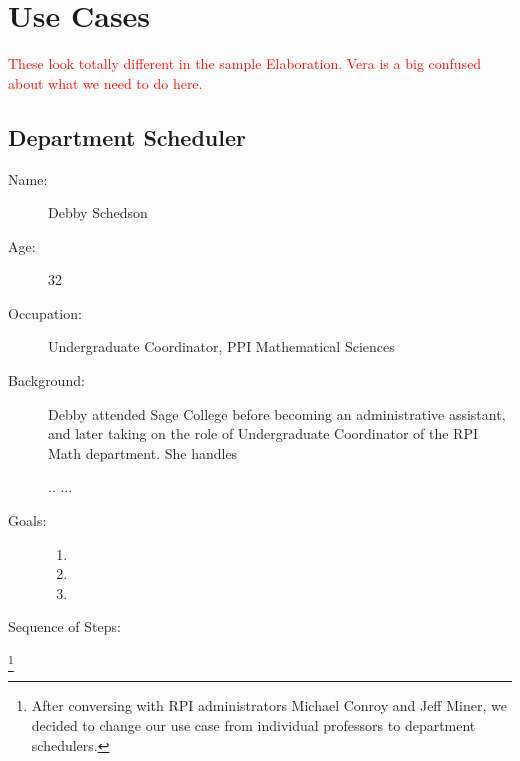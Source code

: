 \documentclass[11pt]{article}
\begin{document}

\begin{comment}
\begin{figure}
	\centering
		\texttt{[image: DeploymentDiagram.png]}
	\caption{Deployment Diagram}
	\label{fig:Deploy}
\end{figure}
\end{comment}


\section{Use Cases}
\textcolor{red}{These look totally different in the sample Elaboration. Vera is a 
big confused about what we need to do here.}

\subsection{Department Scheduler}
\begin{description}
\item[Name:] Debby Schedson
\item[Age:] 32
\item[Occupation:] Undergraduate Coordinator, PPI Mathematical Sciences
\item[Background:]  Debby  attended Sage College before becoming an administrative assistant,
and later taking on the role of Undergraduate Coordinator  of the RPI Math department.  She handles

..
...



\item[Goals:]
\begin{enumerate}
\item  
\item
\item
\end{enumerate}

\item[Sequence of Steps:]

\end{description}


\footnote{After conversing with RPI administrators Michael Conroy and Jeff Miner, we
decided to change our use case from individual professors to department schedulers.}
\end{document}
